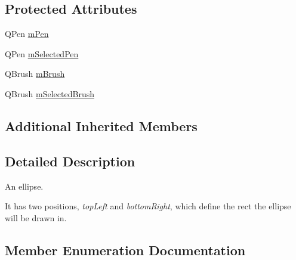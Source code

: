 \subsection*{Protected Attributes}
\begin{DoxyCompactItemize}
\item 
Q\+Pen \hyperlink{classQCPItemEllipse_a16ad9389acf028a7e4ac8fd7a550b2e4}{m\+Pen}
\item 
Q\+Pen \hyperlink{classQCPItemEllipse_a57b047abfce6f1a84ed46ca668c90e21}{m\+Selected\+Pen}
\item 
Q\+Brush \hyperlink{classQCPItemEllipse_a6fa59478cd3ad1b10e6c1f6cedc84bd6}{m\+Brush}
\item 
Q\+Brush \hyperlink{classQCPItemEllipse_a2e49d5547478aa36910ed8a2dcc8a5c0}{m\+Selected\+Brush}
\end{DoxyCompactItemize}
\subsection*{Additional Inherited Members}


\subsection{Detailed Description}
An ellipse. 

 It has two positions, {\itshape top\+Left} and {\itshape bottom\+Right}, which define the rect the ellipse will be drawn in. 

\subsection{Member Enumeration Documentation}
